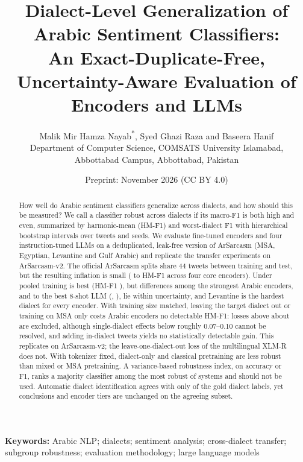 \documentclass[11pt]{article}
\title{Dialect-Level Generalization of Arabic Sentiment Classifiers:\\ An Exact-Duplicate-Free, Uncertainty-Aware Evaluation of Encoders and LLMs}
\author{
Malik Mir Hamza Nayab\textsuperscript{*}, Syed Ghazi Raza and Baseera Hanif\\[0.5em]
\normalsize Department of Computer Science, COMSATS University Islamabad,\\ Abbottabad Campus, Abbottabad, Pakistan
}
\date{\small Preprint: November 2026 (CC BY 4.0)}
\begin{document}
\maketitle
\begingroup{}\endgroup

\begin{abstract}
\noindent
How well do Arabic sentiment classifiers generalize across dialects, and how should this be measured? We call a classifier robust across dialects if its macro-F1 is both high and even, summarized by harmonic-mean (HM-F1) and worst-dialect F1 with hierarchical bootstrap intervals over tweets and seeds. We evaluate \nEnc{} fine-tuned encoders and four instruction-tuned LLMs on a deduplicated, leak-free version of ArSarcasm (MSA, Egyptian, Levantine and Gulf Arabic) and replicate the transfer experiments on ArSarcasm-v2. The official ArSarcasm splits share 44 tweets between training and test, but the resulting inflation is small (\leakInflMin{} to \leakInflMax{} HM-F1 across four core encoders). Under pooled training \bestEnc{} is best (HM-F1 \bestEncHM), but differences among the \topGroupN{} strongest Arabic encoders, and to the best 8-shot LLM (\llmBest, \llmBestHM), lie within uncertainty, and Levantine is the hardest dialect for every encoder. With training size matched, leaving the target dialect out or training on MSA only costs Arabic encoders no detectable HM-F1: losses above about \lodoArLossBound{} are excluded, although single-dialect effects below roughly 0.07--0.10 cannot be resolved, and adding in-dialect tweets yields no statistically detectable gain. This replicates on ArSarcasm-v2; the leave-one-dialect-out loss of the multilingual XLM-R does not. With tokenizer fixed, dialect-only and classical pretraining are less robust than mixed or MSA pretraining. A variance-based robustness index, on accuracy or F1, ranks a majority classifier among the most robust of \mvN{} systems and should not be used. Automatic dialect identification agrees with only \didAgree{} of the gold dialect labels, yet conclusions and encoder tiers are unchanged on the agreeing subset.
\end{abstract}

\noindent\textbf{Keywords:} Arabic NLP; dialects; sentiment analysis; cross-dialect transfer; subgroup robustness; evaluation methodology; large language models
\end{document}
